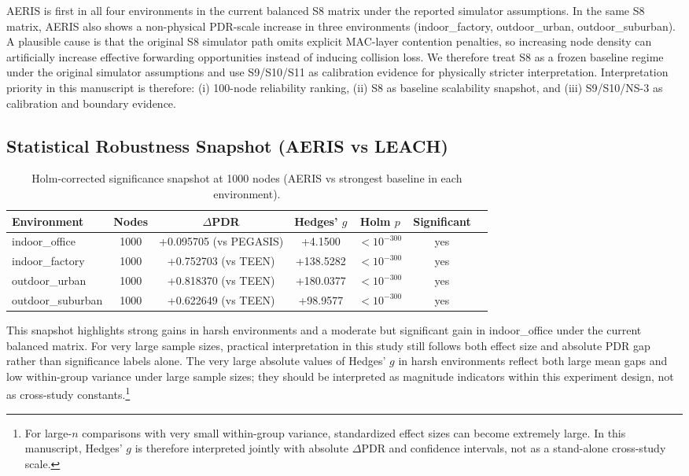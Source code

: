 \documentclass[sensors,article,submit,moreauthors,pdftex]{Definitions/mdpi}
\begin{document}
AERIS is first in all four environments in the current balanced S8 matrix under the reported simulator assumptions.
In the same S8 matrix, AERIS also shows a non-physical PDR-scale increase in three environments (indoor\_factory, outdoor\_urban, outdoor\_suburban). A plausible cause is that the original S8 simulator path omits explicit MAC-layer contention penalties, so increasing node density can artificially increase effective forwarding opportunities instead of inducing collision loss. We therefore treat S8 as a frozen baseline regime under the original simulator assumptions and use S9/S10/S11 as calibration evidence for physically stricter interpretation.
Interpretation priority in this manuscript is therefore: (i) 100-node reliability ranking, (ii) S8 as baseline scalability snapshot, and (iii) S9/S10/NS-3 as calibration and boundary evidence.

\subsection{Statistical Robustness Snapshot (AERIS vs LEACH)}
\begin{table}[H]
\caption{Holm-corrected significance snapshot at 1000 nodes (AERIS vs strongest baseline in each environment).}
\label{tab:robust_snapshot}
\centering
\begin{tabular}{lcccccc}
\toprule
Environment & Nodes & $\Delta$PDR & Hedges' $g$ & Holm $p$ & Significant \\
\midrule
indoor\_office    & 1000 & +0.095705 (vs PEGASIS) & +4.1500 & $<10^{-300}$ & yes \\
indoor\_factory   & 1000 & +0.752703 (vs TEEN) & +138.5282 & $<10^{-300}$ & yes \\
outdoor\_urban    & 1000 & +0.818370 (vs TEEN) & +180.0377 & $<10^{-300}$ & yes \\
outdoor\_suburban & 1000 & +0.622649 (vs TEEN) & +98.9577 & $<10^{-300}$ & yes \\
\bottomrule
\end{tabular}
\end{table}

This snapshot highlights strong gains in harsh environments and a moderate but significant gain in indoor\_office under the current balanced matrix.
For very large sample sizes, practical interpretation in this study still follows both effect size and absolute PDR gap rather than significance labels alone.
The very large absolute values of Hedges' $g$ in harsh environments reflect both large mean gaps and low within-group variance under large sample sizes; they should be interpreted as magnitude indicators within this experiment design, not as cross-study constants.\footnote{For large-\(n\) comparisons with very small within-group variance, standardized effect sizes can become extremely large. In this manuscript, Hedges' \(g\) is therefore interpreted jointly with absolute \(\Delta\)PDR and confidence intervals, not as a stand-alone cross-study scale.}
\end{document}
